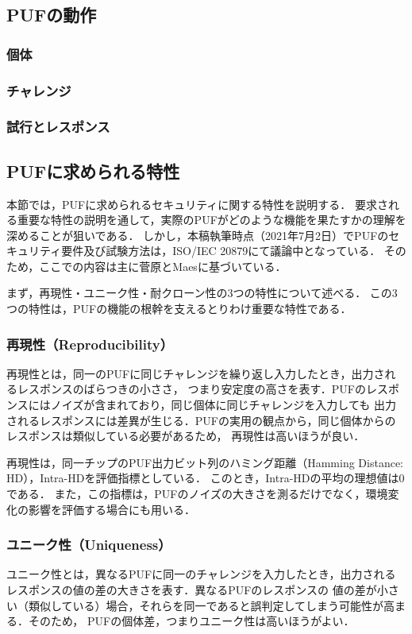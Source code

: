 \documentclass[survey]{ieicej}%
\begin{document}
\subsection{PUFの動作}
\subsubsection{個体}
\subsubsection{チャレンジ}
\subsubsection{試行とレスポンス}
\subsection{PUFに求められる特性}
本節では，PUFに求められるセキュリティに関する特性を説明する．
要求される重要な特性の説明を通して，実際のPUFがどのような機能を果たすかの理解を深めることが狙いである．
しかし，本稿執筆時点（2021年7月2日）でPUFのセキュリティ要件及び試験方法は，ISO/IEC 20879にて議論中となっている．
そのため，ここでの内容は主に菅原\cite{sugatake}とMaesに基づいている．

まず，再現性・ユニーク性・耐クローン性の3つの特性について述べる．
この3つの特性は，PUFの機能の根幹を支えるとりわけ重要な特性である．
\subsubsection{再現性（Reproducibility）}
再現性とは，同一のPUFに同じチャレンジを繰り返し入力したとき，出力されるレスポンスのばらつきの小ささ，
つまり安定度の高さを表す．PUFのレスポンスにはノイズが含まれており，同じ個体に同じチャレンジを入力しても
出力されるレスポンスには差異が生じる．PUFの実用の観点から，同じ個体からのレスポンスは類似している必要があるため，
再現性は高いほうが良い．

再現性は，同一チップのPUF出力ビット列のハミング距離（Hamming Distance: HD），Intra-HDを評価指標としている．
このとき，Intra-HDの平均の理想値は0である．
また，この指標は，PUFのノイズの大きさを測るだけでなく，環境変化の影響を評価する場合にも用いる．
\subsubsection{ユニーク性（Uniqueness）}
ユニーク性とは，異なるPUFに同一のチャレンジを入力したとき，出力されるレスポンスの値の差の大きさを表す．異なるPUFのレスポンスの
値の差が小さい（類似している）場合，それらを同一であると誤判定してしまう可能性が高まる．そのため，
PUFの個体差，つまりユニーク性は高いほうがよい．
\end{document}
